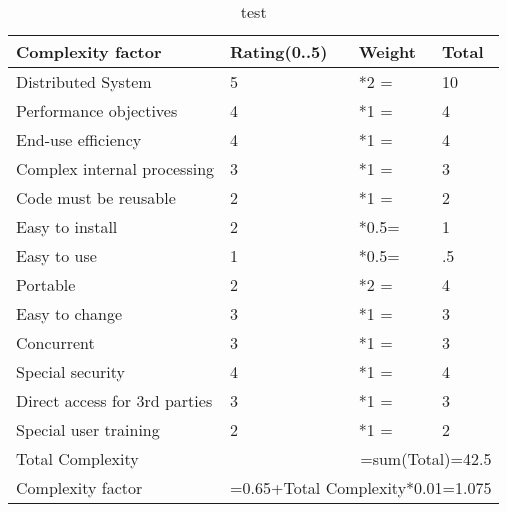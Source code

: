 \documentclass{article}
\begin{document}
\begin{table}
\begin{tabular}{|l|l|l|l|}
\hline
\textbf{Complexity factor}		& \textbf{Rating(0..5)}	& \textbf{Weight}	& \textbf{Total}\\
\hline
Distributed System				& 5						& *2  =			&	10			\\
Performance objectives			& 4						& *1  =			&	4			\\
End-use efficiency				& 4						& *1  =			&	4			\\
Complex internal processing		& 3						& *1  =			&	3			\\
Code must be reusable			& 2						& *1  =			&	2			\\
Easy to install					& 2						& *0.5=			&	1			\\
Easy to use 					& 1						& *0.5=			&	.5			\\
Portable						& 2						& *2  =			&	4			\\
Easy to change					& 3						& *1  =			&	3			\\
Concurrent						& 3						& *1  =			&	3			\\
Special security				& 4						& *1  =			&	4			\\
Direct access for 3rd parties	& 3						& *1  =			&	3			\\
Special user training			& 2						& *1  =			&	2			\\
\hline
Total Complexity	&	\multicolumn{3}{r|}{=sum(Total)=42.5}\\
\hline
Complexity factor	& \multicolumn{3}{r|}{=0.65+Total Complexity*0.01=1.075}\\
\hline
\end{tabular}
\caption{test}
\label{compFactor}
\end{table}
\end{document}
